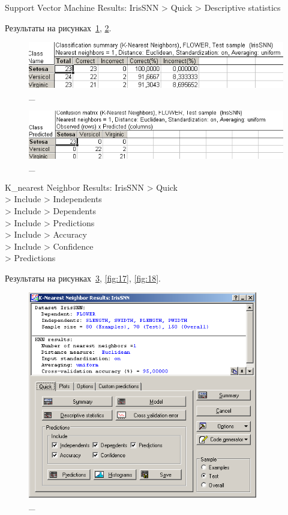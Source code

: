 Support Vector Machine Results: IrisSNN > Quick > Descriptive statistics

Результаты на рисунках~\ref{fig:15_1}, \ref{fig:15_2}.

\begin{figure}[!h]
  \centering

  \includegraphics[width=16cm]
  {inc/ex_18_2.PNG}

  \caption{\_}

  \label{fig:15_1}
\end{figure}

\begin{figure}[!h]
  \centering

  \includegraphics[width=16cm]
  {inc/ex_18.PNG}

  \caption{\_}

  \label{fig:15_2}
\end{figure}

\newpage

K\_nearest Neighbor Results: IrisSNN > Quick \\
> Include > Independents \\
> Include > Dependents \\
> Include > Predictions \\
> Include > Accuracy \\
> Include > Confidence \\
> Predictions

Результаты на рисунках~\ref{fig:16}, \ref{fig:17}, \ref{fig:18}.

\begin{figure}[!h]
  \centering

  \includegraphics[height=9cm]
  {inc/ex_19.PNG}

  \caption{\_}

  \label{fig:16}
\end{figure}

